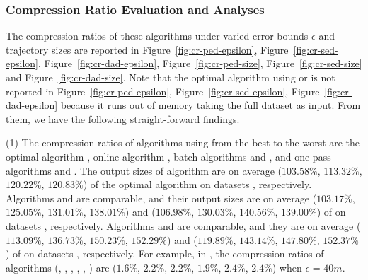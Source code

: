 \vspace{-1ex}
\subsubsection{Compression Ratio Evaluation and Analyses}


The compression ratios of these algorithms under varied error bounds $\epsilon$ and trajectory sizes are reported in Figure~\ref{fig:cr-ped-epsilon}, Figure~\ref{fig:cr-sed-epsilon}, Figure~\ref{fig:cr-dad-epsilon}, Figure~\ref{fig:cr-ped-size}, Figure~\ref{fig:cr-sed-size} and Figure~\ref{fig:cr-dad-size}.
{Note that the optimal algorithm using \sed or \dad is not reported in Figure~\ref{fig:cr-ped-epsilon}, Figure~\ref{fig:cr-sed-epsilon}, Figure~\ref{fig:cr-dad-epsilon} because it runs out of memory taking the full dataset as input}. From them, we have the following straight-forward findings.

\sstab(1) The compression ratios of algorithms using \ped from the best
to the worst are the optimal algorithm \opt, online algorithm \bqsa, batch algorithms \tpa and
\dpa, and one-pass algorithms \siped and \operb.
The output sizes of algorithm \bqsa are on average
($103.58\%$, $113.32\%$, $120.22\%$, $120.83\%$) of the optimal algorithm \opt
on datasets \dSets, respectively.
Algorithms \tpa and \dpa are comparable, and their output sizes are on average
($103.17\%$, $125.05\%$, $131.01\%$, $138.01\%$) and ($106.98\%$, $130.03\%$, $140.56\%$, $139.00\%$) of \opt
on datasets \dSets, respectively.
Algorithms \siped and \operb are comparable, and they are on average
($113.09\%$, $136.73\%$, $150.23\%$, $152.29\%$)
and ($119.89\%$, $143.14\%$, $147.80\%$, $152.37\%$) of \opt on datasets \dSets, respectively.
%
For example, in \mopsi, the compression ratios of algorithms
(\opt, \tpa, \dpa, \bqsa, \siped, \operb ) are ($1.6\%$, $2.2\%$, $2.2\%$, $1.9\%$, $2.4\%$, $2.4\%$) when $\epsilon$ = $40m$.
%

